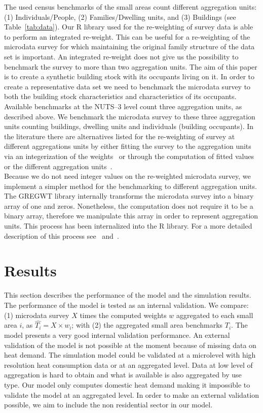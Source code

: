 \documentclass[runningheads,a4paper]{llncs}
\begin{document}
The used census benchmarks of the small areas count different aggregation
units: (1) Individuals/People, (2) Families/Dwelling units, and (3) Buildings
(see Table~\ref{tab:data}). Our R library used for the re-weighting of survey
data is able to perform an integrated re-weight. This can be useful for a
re-weighting of the microdata survey for which maintaining the original family
structure of the data set is important. An integrated re-weight does not give us the
possibility to benchmark the survey to more than two aggregation units.
%
The aim of this paper is to create a synthetic building stock with its
occupants living on it. In order to create a representative data set we need to benchmark
the microdata survey to both the building stock characteristics and
characteristics of its occupants. Available benchmarks at the NUTS--3 level
count three aggregation units, as described above. We benchmark the microdata
survey to these three aggregation units counting buildings, dwelling units and
individuals (building occupants).
%
In the literature there are alternatives listed for the re-weighting of survey
at different aggregations units by either fitting the survey to the aggregation
units via an integerization of the weights~\cite{Guo.2007,Pritchard.2012} or
through the computation of fitted values or the different aggregation
units~\cite{Ma.2015}.
\\

Because we do not need integer values on the re-weighted microdata survey, we implement a
simpler method for the benchmarking to different aggregation units. The GREGWT
library internally transforms the microdata survey into a binary array of one and zeros.
Nonetheless, the computation does not require it to be a binary array, therefore
we manipulate this array in order to represent aggregation units. This process
has been internalized into the R library. For a more detailed description of this
process see~\cite{MunozH.2015.IMA.Synthetic} and~\cite{MunozH.2015.GREGWTR}.
\\

\section{Results}\label{sec:result}

This section describes the performance of the model and the simulation results.
The performance of the model is tested as an internal validation. We compare:
(1) microdata survey $X$ times the computed weights $w$ aggregated to each
small area $i$, as $\hat{T_i} = X \times w_i$; with (2) the aggregated small
area benchmarks $T_i$.
The model presents a very good internal validation performance. An external
validation of the model is not possible at the moment because of missing data
on heat demand. The simulation model could be validated at a microlevel with
high resolution heat consumption data or at an aggregated level. Data at low
level of aggregation is hard to obtain and what is available
is also aggregated by use type. Our model only computes domestic heat demand
making it impossible to validate the model at an aggregated level. In order to
make an external validation possible, we aim to include the non residential
sector in our model.
\\
\end{document}
